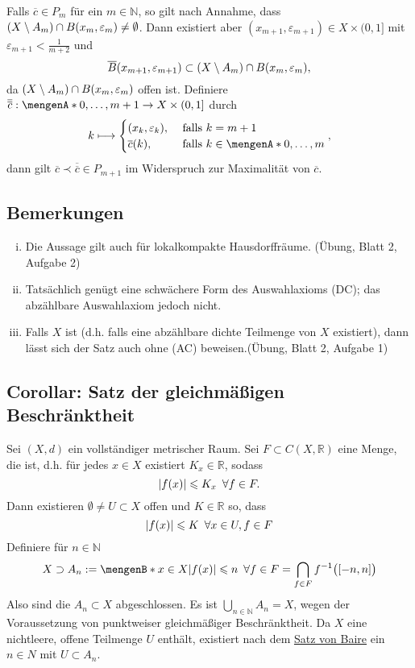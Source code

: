 Falls $\overline{c} \in P_m$ für ein $m \in \mathds{N}$, so gilt nach Annahme, dass $\enbrace*{X \setminus A_m} \cap B(x_m, \varepsilon_m) \not= \emptyset$. Dann 
existiert aber $(x_{m+1},\varepsilon_{m+1}) \in X \times (0,1]$ mit $\varepsilon_{m+1} < \frac{1}{m+2}$ und 
\[
	\overline{B}(x_{m+1}, \varepsilon_{m+1}) \subset  \enbrace*{X \setminus A_m} \cap B(x_m,\varepsilon_m) ,
\]
da $\enbrace*{X \setminus A_m} \cap B(x_m,\varepsilon_m)$ offen ist. Definiere $\overline{\overline{c}} : \set{0, \ldots , m+1} \to X \times (0,1]$ durch
\[
	k \longmapsto \begin{cases}
		(x_k,\varepsilon_k), &\text{ falls } k=m+1\\
		\overline{c}(k), &\text{ falls } k \in \set{0, \ldots , m} 
	\end{cases},
\]
dann gilt $\overline{c} \prec \overline{\overline{c}} \in P_{m+1}$ im Widerspruch zur Maximalität von $\overline{c}$. \bewende

\subsection[Bemerkungen zum Satz von Baire]{Bemerkungen} %
\label{sub:111}
\begin{enumerate}[(i)]
	\item Die Aussage gilt auch für lokalkompakte Hausdorffräume. \hfill(Übung, Blatt 2, Aufgabe 2)
 	\item Tatsächlich genügt eine schwächere Form des Auswahlaxioms (DC); das abzählbare Auswahlaxiom jedoch nicht.
	\item Falls $X$  ist (d.h. falls eine abzählbare dichte Teilmenge von $X$ existiert), dann lässt sich der Satz auch ohne (AC) beweisen.\hfill (Übung, 
	Blatt 2, Aufgabe 1)
\end{enumerate}

\subsection{Corollar: Satz der gleichmäßigen Beschränktheit} %
\label{sub:112}
Sei $(X,d)$ ein vollständiger metrischer Raum. Sei $F \subset C(X,\mathds{R})$ eine Menge, die  ist, d.h. für jedes $x \in X$ 
existiert $K_x \in \mathds{R}$, sodass
\[
	\abs*{f(x)} \le K_x \enspace \forall f \in F. 
\] 
Dann existieren $\emptyset \not= U \subset X$ offen und $K \in \mathds{R}$ so, dass 
\[
	\abs*{f(x)} \le K \enspace \forall x \in U, f \in F 
\]
Definiere für $n \in \mathds{N}$
\begin{align*}
	X \supset A_n := \set[x \in X]{\abs*{f(x)} \le n \enspace \forall f \in F \rule{0cm}{0.3cm}} = \bigcap_{f \in F} f ^{-1} \enbrace[\big]{[-n,n]} 
\end{align*}
Also sind die $A_n \subset X$ abgeschlossen. Es ist $\bigcup_{n \in \mathds{N}} A_n = X$, wegen der Voraussetzung von punktweiser gleichmäßiger Beschränktheit. 
Da $X$ eine nichtleere, offene Teilmenge $U$ enthält, existiert nach dem \hyperref[sub:110]{Satz von Baire} ein $n \in N$ mit $U \subset A_n$. \bewende
\newpage

